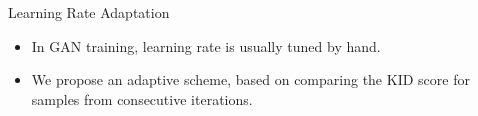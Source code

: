 \documentclass[xcolor={table}]{beamer}
\begin{document}
\begin{frame}{}
\begin{columns}[T, totalwidth=\textwidth]
\begin{column}{.32\textwidth}
\begin{figure}
      \label{fig:fid-kid-bias}
    \end{figure}
    \begin{block}{Learning Rate Adaptation}
      \begin{itemize}
        \item In GAN training, learning rate is usually tuned by hand.
        \item We propose an adaptive scheme, based on comparing the KID score for samples from consecutive iterations.
      \end{itemize}
    \end{block}
     \printbibliography
  \end{column}

\end{columns}


\end{frame}
\end{document}
